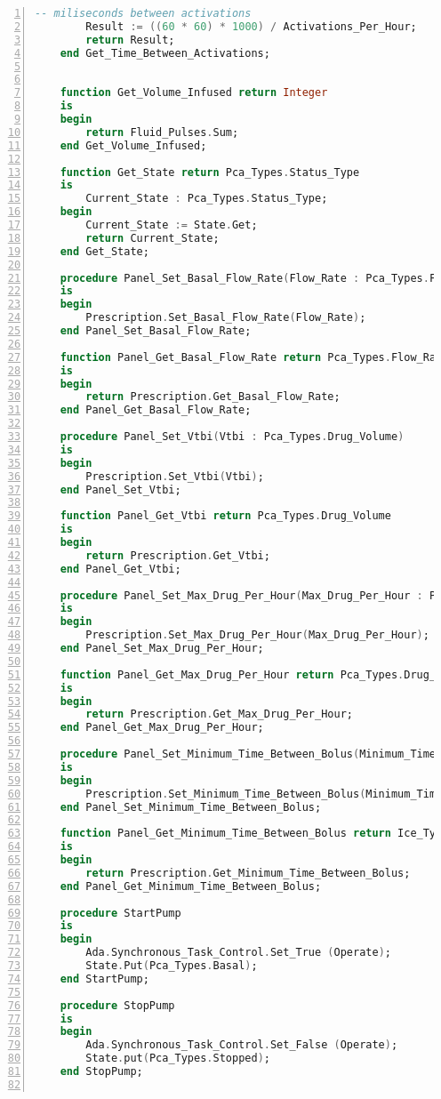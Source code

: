 \begin{lstlisting}[language=ada, gobble=0, numbers=left, caption={\lstinline{Pca_Operation} package}, label={listing:pca_ravenscar:pca_operation}]
        -- miliseconds between activations
        Result := ((60 * 60) * 1000) / Activations_Per_Hour;
        return Result;
    end Get_Time_Between_Activations;


    function Get_Volume_Infused return Integer
    is
    begin
        return Fluid_Pulses.Sum;
    end Get_Volume_Infused;

    function Get_State return Pca_Types.Status_Type
    is
        Current_State : Pca_Types.Status_Type;
    begin
        Current_State := State.Get;
        return Current_State;
    end Get_State;

    procedure Panel_Set_Basal_Flow_Rate(Flow_Rate : Pca_Types.Flow_Rate)
    is
    begin
        Prescription.Set_Basal_Flow_Rate(Flow_Rate);
    end Panel_Set_Basal_Flow_Rate;

    function Panel_Get_Basal_Flow_Rate return Pca_Types.Flow_Rate
    is
    begin
        return Prescription.Get_Basal_Flow_Rate;
    end Panel_Get_Basal_Flow_Rate;

    procedure Panel_Set_Vtbi(Vtbi : Pca_Types.Drug_Volume)
    is
    begin
        Prescription.Set_Vtbi(Vtbi);
    end Panel_Set_Vtbi;

    function Panel_Get_Vtbi return Pca_Types.Drug_Volume
    is
    begin
        return Prescription.Get_Vtbi;
    end Panel_Get_Vtbi;

    procedure Panel_Set_Max_Drug_Per_Hour(Max_Drug_Per_Hour : Pca_Types.Drug_Volume)
    is
    begin
        Prescription.Set_Max_Drug_Per_Hour(Max_Drug_Per_Hour);
    end Panel_Set_Max_Drug_Per_Hour;

    function Panel_Get_Max_Drug_Per_Hour return Pca_Types.Drug_Volume
    is
    begin
        return Prescription.Get_Max_Drug_Per_Hour;
    end Panel_Get_Max_Drug_Per_Hour;

    procedure Panel_Set_Minimum_Time_Between_Bolus(Minimum_Time_Between_Bolus : Ice_Types.Minute)
    is
    begin
        Prescription.Set_Minimum_Time_Between_Bolus(Minimum_Time_Between_Bolus);
    end Panel_Set_Minimum_Time_Between_Bolus;

    function Panel_Get_Minimum_Time_Between_Bolus return Ice_Types.Minute
    is
    begin
        return Prescription.Get_Minimum_Time_Between_Bolus;
    end Panel_Get_Minimum_Time_Between_Bolus;

    procedure StartPump
    is
    begin
        Ada.Synchronous_Task_Control.Set_True (Operate);
        State.Put(Pca_Types.Basal);
    end StartPump;

    procedure StopPump
    is
    begin
        Ada.Synchronous_Task_Control.Set_False (Operate);
        State.put(Pca_Types.Stopped);
    end StopPump;


\end{lstlisting}
